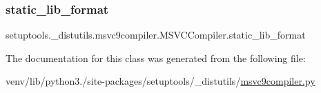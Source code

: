 \subsubsection{\texorpdfstring{static\+\_\+lib\+\_\+format}{static\_lib\_format}}
{\footnotesize\ttfamily setuptools.\+\_\+distutils.\+msvc9compiler.\+M\+S\+V\+C\+Compiler.\+static\+\_\+lib\+\_\+format\hspace{0.3cm}{\ttfamily [static]}}



The documentation for this class was generated from the following file\+:\begin{DoxyCompactItemize}
\item 
venv/lib/python3./site-\/packages/setuptools/\+\_\+distutils/\hyperlink{setuptools_2__distutils_2msvc9compiler_8py}{msvc9compiler.\+py}\end{DoxyCompactItemize}
